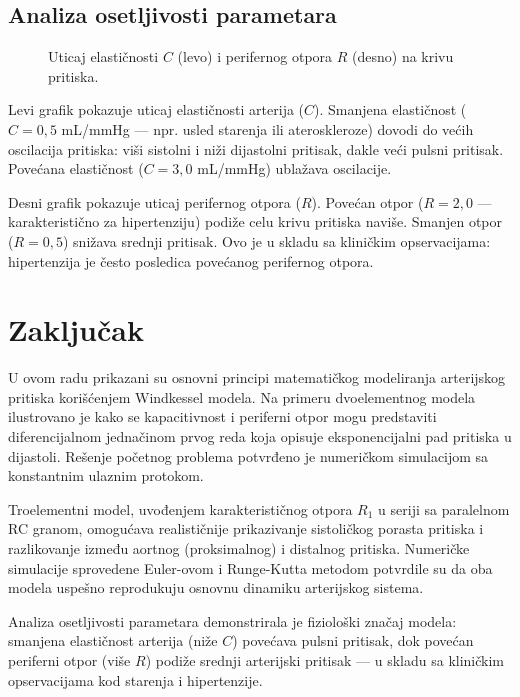 \documentclass[12pt,a4paper]{article}
\begin{document}
\subsection{Analiza osetljivosti parametara}

\begin{figure}[H]
    \centering
    \caption{Uticaj elastičnosti $C$ (levo) i perifernog otpora $R$ (desno) na krivu pritiska.}
    \label{fig:osetljivost}
\end{figure}

Levi grafik pokazuje uticaj elastičnosti arterija ($C$). Smanjena elastičnost ($C = 0{,}5$ mL/mmHg --- npr. usled starenja ili ateroskleroze) dovodi do većih oscilacija pritiska: viši sistolni i niži dijastolni pritisak, dakle veći pulsni pritisak. Povećana elastičnost ($C = 3{,}0$ mL/mmHg) ublažava oscilacije.

Desni grafik pokazuje uticaj perifernog otpora ($R$). Povećan otpor ($R = 2{,}0$ --- karakteristično za hipertenziju) podiže celu krivu pritiska naviše. Smanjen otpor ($R = 0{,}5$) snižava srednji pritisak. Ovo je u skladu sa kliničkim opservacijama: hipertenzija je često posledica povećanog perifernog otpora.

\section{Zaključak}

U ovom radu prikazani su osnovni principi matematičkog modeliranja arterijskog pritiska korišćenjem Windkessel modela. Na primeru dvoelementnog modela ilustrovano je kako se kapacitivnost i periferni otpor mogu predstaviti diferencijalnom jednačinom prvog reda koja opisuje eksponencijalni pad pritiska u dijastoli. Rešenje početnog problema potvrđeno je numeričkom simulacijom sa konstantnim ulaznim protokom.

Troelementni model, uvođenjem karakterističnog otpora $R_1$ u seriji sa paralelnom RC granom, omogućava realističnije prikazivanje sistoličkog porasta pritiska i razlikovanje između aortnog (proksimalnog) i distalnog pritiska. Numeričke simulacije sprovedene Euler-ovom i Runge-Kutta metodom potvrdile su da oba modela uspešno reprodukuju osnovnu dinamiku arterijskog sistema.

Analiza osetljivosti parametara demonstrirala je fiziološki značaj modela: smanjena elastičnost arterija (niže $C$) povećava pulsni pritisak, dok povećan periferni otpor (više $R$) podiže srednji arterijski pritisak --- u skladu sa kliničkim opservacijama kod starenja i hipertenzije.
\end{document}
